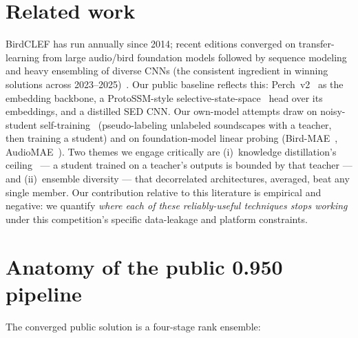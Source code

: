 \documentclass{ceurart}
\begin{document}
\section{Related work}
\label{sec:related}

BirdCLEF has run annually since 2014; recent editions converged on
transfer-learning from large audio/bird foundation models followed by sequence
modeling and heavy ensembling of diverse CNNs (the consistent ingredient in
winning solutions across 2023--2025)~\cite{lifeclef-overview}. Our public
baseline reflects this: Perch~v2~\cite{perch} as the embedding backbone, a
ProtoSSM-style selective-state-space~\cite{mamba} head over its embeddings, and a
distilled SED CNN. Our own-model attempts draw on noisy-student
self-training~\cite{noisystudent} (pseudo-labeling unlabeled soundscapes with a
teacher, then training a student) and on foundation-model linear probing
(Bird-MAE~\cite{birdmae}, AudioMAE~\cite{audiomae}). Two themes we engage
critically are (i)~knowledge distillation's ceiling~\cite{distillation} --- a
student trained on a teacher's outputs is bounded by that teacher --- and
(ii)~ensemble diversity --- that decorrelated architectures, averaged, beat any
single member. Our contribution relative to this literature is empirical and
negative: we quantify \emph{where each of these reliably-useful techniques stops
working} under this competition's specific data-leakage and platform constraints.

\section{Anatomy of the public 0.950 pipeline}
\label{sec:anatomy}

The converged public solution is a four-stage rank ensemble:
\end{document}
